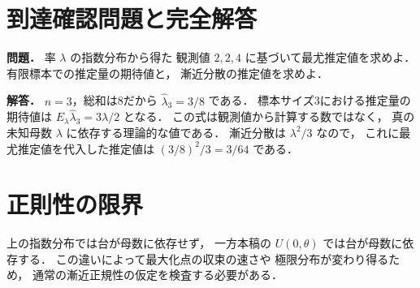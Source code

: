 \documentclass[a5paper,10pt,onecolumn]{jsarticle}
\theoremstyle{mathnotetheorem}
\begin{document}
\section*{到達確認問題と完全解答}
\noindent\textbf{問題．}
率 $\lambda$ の指数分布から得た
観測値 $2,2,4$ に基づいて最尤推定値を求めよ．
有限標本での推定量の期待値と，
漸近分散の推定値を求めよ．

\medskip\noindent\textbf{解答．}
$n=3$，総和は8だから
$\widehat\lambda_3=3/8$ である．
標本サイズ3における推定量の期待値は
$E_\lambda\widehat\lambda_3=3\lambda/2$ となる．
この式は観測値から計算する数ではなく，
真の未知母数 $\lambda$ に依存する理論的な値である．
漸近分散は $\lambda^2/3$ なので，
これに最尤推定値を代入した推定値は
$(3/8)^2/3=3/64$ である．
\section*{正則性の限界}
上の指数分布では台が母数に依存せず，
一方本稿の $U(0,\theta)$ では台が母数に依存する．
この違いによって最大化点の収束の速さや
極限分布が変わり得るため，
通常の漸近正規性の仮定を検査する必要がある．
\end{document}
